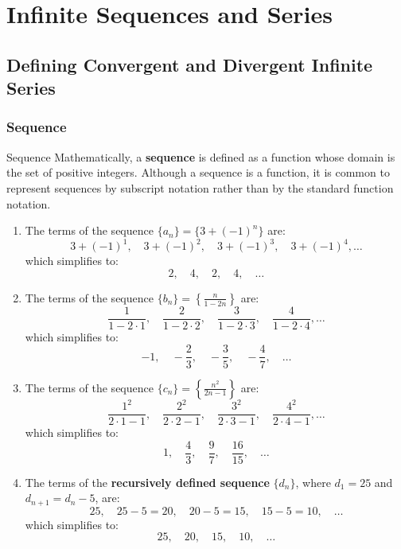 \documentclass[12pt]{article}
\theoremstyle{beautifulthm}
\begin{document}
\section{Infinite Sequences
and Series }

\subsection{Defining Convergent and
Divergent Infinite Series}
\subsubsection{Sequence}

\begin{Definition}{Sequence}{}
    Mathematically, a \textbf{sequence} is defined as a function whose domain is the set of positive integers. Although a sequence is a function, it is common to represent sequences by subscript notation rather than by the standard function notation.
\end{Definition}

\begin{tcolorbox}[colback=examplebg, colframe=red!75!black, title=\textbf{EXAMPLE 1:  Listing the Terms of a Sequence}, fonttitle=\bfseries, sharp corners]

\begin{enumerate}
    \item The terms of the sequence $\{a_n\} = \{3 + (-1)^n\}$ are:
    \[
    3 + (-1)^1, \quad 3 + (-1)^2, \quad 3 + (-1)^3, \quad 3 + (-1)^4, \dots
    \]
    which simplifies to:
    \[
    2, \quad 4, \quad 2, \quad 4, \quad \dots
    \]

    \item The terms of the sequence $\{b_n\} = \left\{\frac{n}{1 - 2n}\right\}$ are:
    \[
    \frac{1}{1 - 2 \cdot 1}, \quad \frac{2}{1 - 2 \cdot 2}, \quad \frac{3}{1 - 2 \cdot 3}, \quad \frac{4}{1 - 2 \cdot 4}, \dots
    \]
    which simplifies to:
    \[
    -1, \quad -\frac{2}{3}, \quad -\frac{3}{5}, \quad -\frac{4}{7}, \quad \dots
    \]

    \item The terms of the sequence $\{c_n\} = \left\{\frac{n^2}{2n - 1}\right\}$ are:
    \[
    \frac{1^2}{2 \cdot 1 - 1}, \quad \frac{2^2}{2 \cdot 2 - 1}, \quad \frac{3^2}{2 \cdot 3 - 1}, \quad \frac{4^2}{2 \cdot 4 - 1}, \dots
    \]
    which simplifies to:
    \[
    1, \quad \frac{4}{3}, \quad \frac{9}{7}, \quad \frac{16}{15}, \quad \dots
    \]

    \item The terms of the \textbf{recursively defined sequence} $\{d_n\}$, where $d_1 = 25$ and $d_{n+1} = d_n - 5$, are:
    \[
    25, \quad 25 - 5 = 20, \quad 20 - 5 = 15, \quad 15 - 5 = 10, \quad \dots
    \]
    which simplifies to:
    \[
    25, \quad 20, \quad 15, \quad 10, \quad \dots
    \]
\end{enumerate}
\end{tcolorbox}
\end{document}
